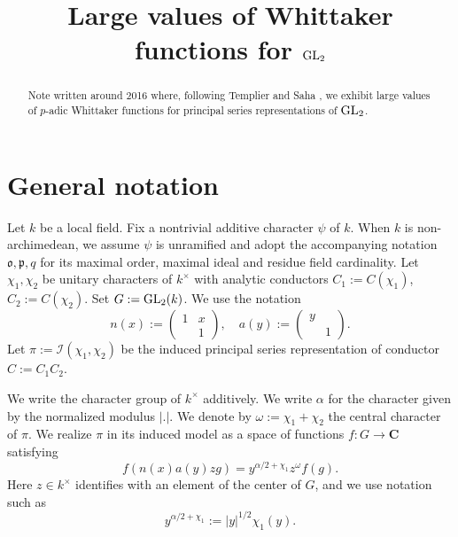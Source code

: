 \documentclass[reqno]{amsart} 
\title{Large values of Whittaker functions for $\operatorname{GL}_2$}
\begin{document}
\begin{abstract}
  Note written around 2016 where, following Templier \cite{MR3272013} and Saha \cite{MR3544630}, we exhibit large values of $p$-adic Whittaker functions for principal series representations of $\operatorname{GL}_2$.
\end{abstract}
\maketitle
\tableofcontents

\section{General notation}
\label{sec:org788739a}
Let $k$ be a local field.  Fix a nontrivial additive character $\psi$ of $k$.  When $k$ is non-archimedean, we assume $\psi$ is unramified and adopt the accompanying notation $\mathfrak{o}, \mathfrak{p}, q$ for its maximal order, maximal ideal and residue field cardinality.  Let $\chi_1, \chi_2$ be unitary characters of $k^\times$ with analytic conductors $C_1 := C(\chi_1)$, $C_2 := C(\chi_2)$.  Set $G := \operatorname{GL}_2(k)$.  We use the notation
\begin{equation*}
  n(x) := 
  \begin{pmatrix}
    1 & x \\
      & 1
  \end{pmatrix}
  ,
  \quad
  a(y) := 
  \begin{pmatrix}
    y &  \\
      & 1
  \end{pmatrix}
  .
\end{equation*}
Let $\pi := \mathcal{I}(\chi_1, \chi_2)$ be the induced principal series representation of conductor $C := C_1 C_2$.

We write the character group of $k^\times$ additively.  We write $\alpha$ for the character given by the normalized modulus $|.|$.  We denote by $\omega := \chi_1 + \chi_2$ the central character of $\pi$.  We realize $\pi$ in its induced model as a space of functions $f : G \rightarrow \mathbf{C}$ satisfying
\begin{equation*}
  f(n(x) a(y) z g) = y^{\alpha/2+\chi_1} z^{\omega} f(g).
\end{equation*}
Here $z \in k^\times$ identifies with an element of the center of $G$, and we use notation such as
\begin{equation*}
  y^{\alpha / 2 + \chi_1} := \lvert y \rvert^{1/2} \chi_1(y).
\end{equation*}
\end{document}
